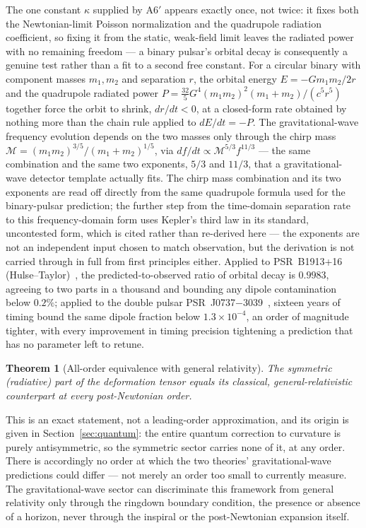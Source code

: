 \documentclass[aps,prd,twocolumn,superscriptaddress,nofootinbib]{revtex4-2}
\newtheorem{theorem}{Theorem}
\begin{document}
The one constant $\kappa$ supplied by A6$'$ appears exactly once, not
twice: it fixes both the Newtonian-limit Poisson normalization and the
quadrupole radiation coefficient, so fixing it from the static, weak-field
limit leaves the radiated power with no remaining freedom — a binary
pulsar's orbital decay is consequently a genuine test rather than a fit
to a second free constant. For a circular binary with component masses
$m_1, m_2$ and separation $r$, the orbital energy $E=-Gm_1m_2/2r$ and the
quadrupole radiated power
$P = \tfrac{32}{5}G^4(m_1m_2)^2(m_1+m_2)/(c^5r^5)$ together force the
orbit to shrink, $dr/dt<0$, at a closed-form rate obtained by nothing
more than the chain rule applied to $dE/dt=-P$. The gravitational-wave
frequency evolution depends on the two masses only through the chirp
mass $\mathcal{M}=(m_1m_2)^{3/5}/(m_1+m_2)^{1/5}$, via
$df/dt \propto \mathcal{M}^{5/3}f^{11/3}$ — the same combination and the
same two exponents, $5/3$ and $11/3$, that a gravitational-wave detector
template actually fits. The chirp mass combination and its two exponents
are read off directly from the same quadrupole formula used for the
binary-pulsar prediction; the further step from the time-domain
separation rate to this frequency-domain form uses Kepler's third law in
its standard, uncontested form, which is cited rather than re-derived
here — the exponents are not an independent input chosen to match
observation, but the derivation is not carried through in full from
first principles either. Applied to PSR~B1913+16
(Hulse–Taylor)~\cite{HulseTaylor1975,WeisbergHuang2016}, the
predicted-to-observed
ratio of orbital decay is $0.9983$, agreeing to two parts in a thousand
and bounding any dipole contamination below $0.2\%$; applied to the
double pulsar PSR~J0737$-$3039~\cite{Kramer2021}, sixteen years of timing bound the same
dipole fraction below $1.3\times10^{-4}$, an order of magnitude tighter,
with every improvement in timing precision tightening a prediction that
has no parameter left to retune.

\begin{theorem}[All-order equivalence with general relativity]\label{thm:allorder}
The symmetric (radiative) part of the deformation tensor equals its
classical, general-relativistic counterpart at \emph{every}
post-Newtonian order.
\end{theorem}

This is an exact statement, not a leading-order approximation, and its
origin is given in Section~\ref{sec:quantum}: the entire quantum
correction to curvature is purely antisymmetric, so the symmetric sector
carries none of it, at any order. There is accordingly no order at which
the two theories' gravitational-wave predictions could differ — not
merely an order too small to currently measure. The gravitational-wave
sector can discriminate this framework from general relativity only
through the ringdown boundary condition, the presence or absence of a
horizon, never through the inspiral or the post-Newtonian expansion
itself.
\end{document}
